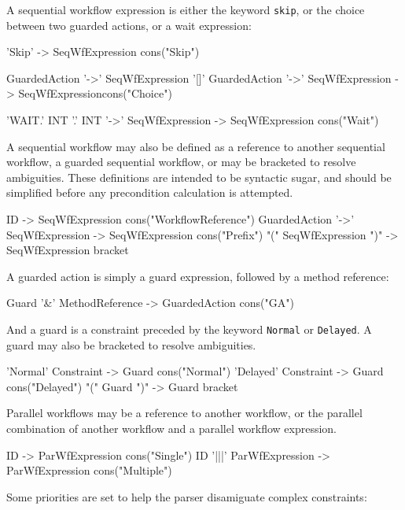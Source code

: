 A sequential workflow expression is either the keyword \verb|skip|, or
the choice between two guarded actions, or a wait expression:
\begin{code}
'Skip'                                   -> SeqWfExpression {cons("Skip")}

GuardedAction '->' SeqWfExpression
'[]' 
GuardedAction '->' SeqWfExpression       -> SeqWfExpression{cons("Choice")}

'WAIT.' INT '.' INT '->' SeqWfExpression -> SeqWfExpression {cons("Wait")}
\end{code}

A sequential workflow may also be defined as a reference to another
sequential workflow, a guarded sequential workflow, or may be
bracketed to resolve ambiguities.  These definitions are intended to
be syntactic sugar, and should be simplified before any precondition
calculation is attempted.

\begin{code}
ID				   -> SeqWfExpression {cons("WorkflowReference")}  
GuardedAction '->' SeqWfExpression -> SeqWfExpression {cons("Prefix")}
"(" SeqWfExpression ")" 	   -> SeqWfExpression {bracket}
\end{code}

A guarded action is simply a guard expression, followed by a method
reference:

\begin{code}
Guard '&' MethodReference -> GuardedAction {cons("GA")}
\end{code}

And a guard is a constraint preceded by the keyword \verb|Normal| or
\verb|Delayed|.  A guard may also be bracketed to resolve ambiguities.

\begin{code}
'Normal' Constraint  -> Guard {cons("Normal")}
'Delayed' Constraint -> Guard {cons("Delayed")}
"(" Guard ")"        -> Guard {bracket}
\end{code}  

Parallel workflows may be a reference to another workflow, or the
parallel combination of another workflow and a parallel workflow
expression.

\begin{code}    
ID			 -> ParWfExpression {cons("Single")}
ID '|||' ParWfExpression -> ParWfExpression {cons("Multiple")}
\end{code}

Some priorities are set to help the parser disamiguate complex constraints:

